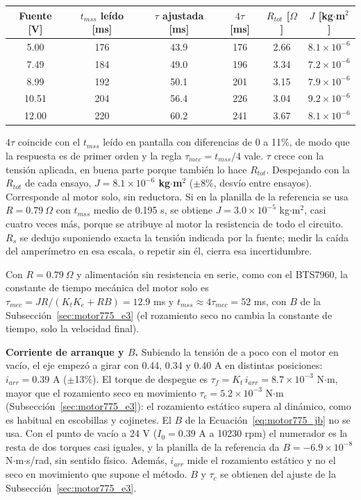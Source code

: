 \begin{center}
\begin{tabular}{cccccc}\toprule
Fuente [V] & $t_{mss}$ leído [ms] & $\tau$ ajustada [ms] & $4\tau$ [ms] & $R_{tot}$ [$\Omega$] & $J$ [kg$\cdot$m$^2$]\\\midrule
5.00 & 176 & 43.9 & 176 & 2.66 & $8.1\times10^{-6}$\\
7.49 & 184 & 49.0 & 196 & 3.34 & $7.2\times10^{-6}$\\
8.99 & 192 & 50.1 & 201 & 3.15 & $7.9\times10^{-6}$\\
10.51 & 204 & 56.4 & 226 & 3.04 & $9.2\times10^{-6}$\\
12.00 & 220 & 60.2 & 241 & 3.67 & $8.1\times10^{-6}$\\\bottomrule
\end{tabular}
\end{center}

$4\tau$ coincide con el $t_{mss}$ leído en pantalla con diferencias de 0 a 11\%, de modo que la respuesta es de primer orden y la regla $\tau_{mec} = t_{mss}/4$ vale. $\tau$ crece con la tensión aplicada, en buena parte porque también lo hace $R_{tot}$. Despejando con la $R_{tot}$ de cada ensayo, \textbf{$J = 8.1\times10^{-6}$ kg$\cdot$m$^2$} ($\pm$8\%, desvío entre ensayos). Corresponde al motor solo, sin reductora. Si en la planilla de la referencia se usa $R = 0.79\ \Omega$ con $t_{mss}$ medio de 0.195 s, se obtiene $J = 3.0\times10^{-5}$ kg$\cdot$m$^2$, casi cuatro veces más, porque se atribuye al motor la resistencia de todo el circuito. $R_s$ se dedujo suponiendo exacta la tensión indicada por la fuente; medir la caída del amperímetro en esa escala, o repetir sin él, cierra esa incertidumbre.

Con $R = 0.79\ \Omega$ y alimentación sin resistencia en serie, como con el BTS7960, la constante de tiempo mecánica del motor solo es $\tau_{mec} = J R/(K_tK_e + RB) = 12.9$ ms y $t_{mss} \approx 4\tau_{mec} = 52$ ms, con $B$ de la Subsección~\ref{sec:motor775_e3} (el rozamiento seco no cambia la constante de tiempo, solo la velocidad final).

\textbf{Corriente de arranque y $B$.} Subiendo la tensión de a poco con el motor en vacío, el eje empezó a girar con 0.44, 0.34 y 0.40 A en distintas posiciones: $i_{arr} = 0.39$ A ($\pm$13\%). El torque de despegue es $\tau_f = K_t\,i_{arr} = 8.7\times10^{-3}$ N$\cdot$m, mayor que el rozamiento seco en movimiento $\tau_c = 5.2\times10^{-3}$ N$\cdot$m (Subsección~\ref{sec:motor775_e3}): el rozamiento estático supera al dinámico, como es habitual en escobillas y cojinetes. El $B$ de la Ecuación~\eqref{eq:motor775_jb} no se usa. Con el punto de vacío a 24 V ($I_0 = 0.39$ A a 10230 rpm) el numerador es la resta de dos torques casi iguales, y la planilla de la referencia da $B = -6.9\times10^{-8}$ N$\cdot$m$\cdot$s/rad, sin sentido físico. Además, $i_{arr}$ mide el rozamiento estático y no el seco en movimiento que supone el método. $B$ y $\tau_c$ se obtienen del ajuste de la Subsección~\ref{sec:motor775_e3}.

